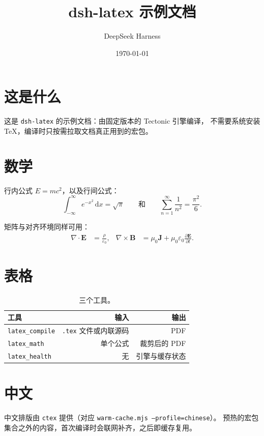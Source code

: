 \documentclass[11pt]{ctexart}
\title{dsh-latex 示例文档}
\author{DeepSeek Harness}
\date{\today}
\begin{document}
\maketitle

\section{这是什么}
这是 \texttt{dsh-latex} 的示例文档：由固定版本的 Tectonic 引擎编译，
不需要系统安装 TeX，编译时只按需拉取文档真正用到的宏包。

\section{数学}
行内公式 $E = mc^2$，以及行间公式：
\begin{equation}
  \int_{-\infty}^{\infty} e^{-x^{2}}\,\mathrm{d}x = \sqrt{\pi}
  \qquad\text{和}\qquad
  \sum_{n=1}^{\infty}\frac{1}{n^{2}} = \frac{\pi^{2}}{6}.
\end{equation}

矩阵与对齐环境同样可用：
\begin{align}
  \nabla \cdot \mathbf{E} &= \frac{\rho}{\varepsilon_0}, &
  \nabla \times \mathbf{B} &= \mu_0 \mathbf{J}
  + \mu_0\varepsilon_0 \frac{\partial \mathbf{E}}{\partial t}.
\end{align}

\section{表格}
\begin{table}[ht]
  \centering
  \begin{tabular}{lrr}
    \toprule
    工具 & 输入 & 输出 \\
    \midrule
    \texttt{latex\_compile} & \texttt{.tex} 文件或内联源码 & PDF \\
    \texttt{latex\_math}    & 单个公式                  & 裁剪后的 PDF \\
    \texttt{latex\_health}  & 无                        & 引擎与缓存状态 \\
    \bottomrule
  \end{tabular}
  \caption{三个工具。}
\end{table}

\section{中文}
中文排版由 \texttt{ctex} 提供（对应 \texttt{warm-cache.mjs --profile=chinese}）。
预热的宏包集合之外的内容，首次编译时会联网补齐，之后即缓存复用。
\end{document}
